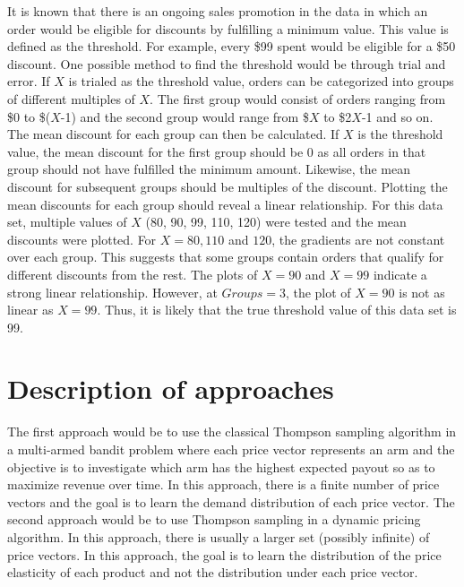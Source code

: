 \documentclass[a4paper]{article}
\begin{document}
It is known that there is an ongoing sales promotion in the data in which an order would be eligible for discounts by fulfilling a minimum value. This value is defined as the threshold. For example, every \$99 spent would be eligible for a \$50 discount. One possible method to find the threshold would be through trial and error.
\newline
\newline
If $X$ is trialed as the threshold value, orders can be categorized into groups of different multiples of $X$. The first group would consist of orders ranging from \$0 to \$($X$-1) and the second group would range from \$$X$ to \$2$X$-1 and so on. The mean discount for each group can then be calculated. If $X$ is the threshold value, the mean discount for the first group should be 0 as all orders in that group should not have fulfilled the minimum amount. Likewise, the mean discount for subsequent groups should be multiples of the discount. Plotting the mean discounts for each group should reveal a linear relationship.
\newline
\newline
For this data set, multiple values of $X$ (80, 90, 99, 110, 120) were tested and the mean discounts were plotted. For $X = 80, 110$ and $120$, the gradients are not constant over each group. This suggests that some groups contain orders that qualify for different discounts from the rest. The plots of $X = 90$ and $X = 99$ indicate a strong linear relationship. However, at $Groups = 3$, the plot of $X = 90$ is not as linear as $X=99$. Thus, it is likely that the true threshold value of this data set is 99.

\section{Description of approaches}
\label{sec:approach}
The first approach would be to use the classical Thompson sampling algorithm in a multi-armed bandit problem where each price vector represents an arm and the objective is to investigate which arm has the highest expected payout so as to maximize revenue over time. In this approach, there is a finite number of price vectors and the goal is to learn the demand distribution of each price vector.
\newline
\newline
The second approach would be to use Thompson sampling in a dynamic pricing algorithm. In this approach, there is usually a larger set (possibly infinite) of price vectors. In this approach, the goal is to learn the distribution of the price elasticity of each product and not the distribution under each price vector.
\end{document}
